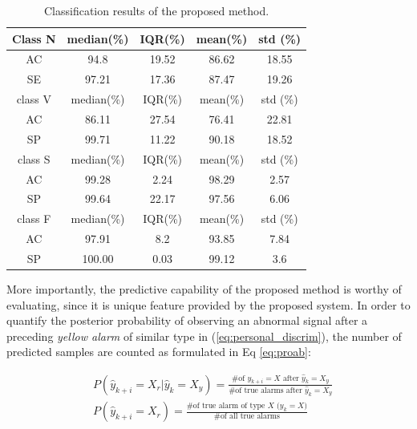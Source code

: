 \begin{table}[t]
	\caption{Classification results of the proposed method.}
	\centering
	\begin{tabular}{|c|c|c|c|c|}
		\hline
		Class N & median(\%) & IQR(\%) & mean(\%)& std (\%) \\ 
		\hline 
		AC & 94.8& 19.52 & 86.62 & 18.55\\ 
		\hline 
		SE & 97.21  & 17.36 & 87.47 &19.26 \\ 
		\hline 
		class V & median(\%) & IQR(\%) & mean(\%)& std (\%) \\ 
		\hline 
		AC & 86.11 & 27.54 & 76.41 & 22.81 \\ 
		\hline 
		SP & 99.71 & 11.22 & 90.18 & 18.52 \\ 
		\hline 
		class S & median(\%) & IQR(\%) & mean(\%)& std (\%)\\ 
		\hline 
		AC & 99.28 & 2.24& 98.29&2.57 \\ 
		\hline 
		SP & 99.64& 22.17& 97.56 & 6.06\\ 
		\hline 
		class F & median(\%) & IQR(\%) & mean(\%)& std (\%) \\ 
		\hline 
		AC & 97.91 & 8.2&93.85&7.84\\ 
		\hline 
		SP & 100.00 & 0.03&99.12&3.6\\ 
		\hline 
	\end{tabular} 
	\label{table:result1}
\end{table}


More importantly, the predictive capability of the proposed method is worthy of evaluating, since it is unique feature provided by the proposed system. In order to quantify the posterior probability of observing an abnormal signal after a preceding \textit{yellow alarm} of similar type in (\ref{eq:personal_discrim}), the number of predicted samples are counted as formulated in Eq \ref{eq:proab}:

\begin{align}
\nonumber 
&P(\hat{y}_{k+i}=X_r|\hat{y}_{k}=X_y)=\frac{\text{\# of $y_{k+i}=X$ after $\hat{y}_k=X_y$}}{\text{\# of true alarms after $\hat{y}_k=X_y$}} \\
&P(\hat{y}_{k+i}=X_r)=\frac{\text{\# of true alarm of type $X$ ($y_{k}=X$)}}{\text{\# of all true alarms}} 
\label{eq:proab}
\end{align}

